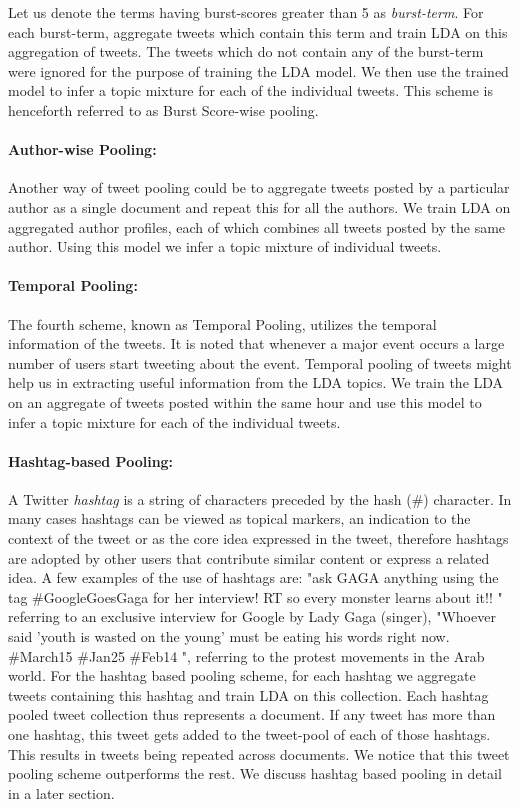 \documentclass[10pt,a5paper,twoside]{article}
\begin{document}
Let us denote the terms having burst-scores greater than 5 as \textit{burst-term}. For each burst-term, aggregate tweets which contain this term and train LDA on this aggregation of tweets. The tweets which do not contain any of the burst-term were ignored for the purpose of training the LDA model. We then use the trained model to infer a topic mixture for each of the individual tweets. This scheme is henceforth referred to as Burst Score-wise pooling.

\paragraph{Author-wise Pooling: }
Another way of tweet pooling could be to aggregate tweets posted by a particular author as a single document and repeat this for all the authors\cite{Weng2010wsdm}. We train LDA on aggregated author profiles, each of which combines all tweets posted by the same author. Using this model we infer a topic mixture of individual tweets.

\paragraph{Temporal Pooling: }
The fourth scheme, known as Temporal Pooling, utilizes the temporal information of the tweets. It is noted that whenever a major event occurs a large number of users start tweeting about the event. Temporal pooling of tweets might help us in extracting useful information from the LDA topics. We train the LDA on an aggregate of tweets posted within the same hour and use this model to infer a topic mixture for each of the individual tweets.

\paragraph{Hashtag-based Pooling:}
A Twitter \textit{hashtag} is a string of characters preceded by the hash (\#) character. In many cases hashtags can be viewed as topical markers, an indication to the context of the tweet or as the core idea expressed in the tweet, therefore hashtags are adopted by other users that contribute similar content or express a related idea. A few examples of the use of hashtags are: "ask GAGA anything using the tag \#GoogleGoesGaga for her interview! RT so every monster learns about it!! " referring to an exclusive interview for Google by Lady Gaga (singer), "Whoever
said 'youth is wasted on the young' must be eating his words right now. \#March15 \#Jan25 \#Feb14 ", referring to the protest movements in the Arab world.
For the hashtag based pooling scheme, for each hashtag we aggregate tweets containing this hashtag and train LDA on this collection. Each hashtag pooled tweet collection thus represents a document. If any tweet has more than one hashtag, this tweet gets added to the tweet-pool of each of those hashtags. This results in tweets being repeated across documents. We notice that this tweet pooling scheme outperforms the rest. We discuss hashtag based pooling in detail in a later section.
\end{document}

